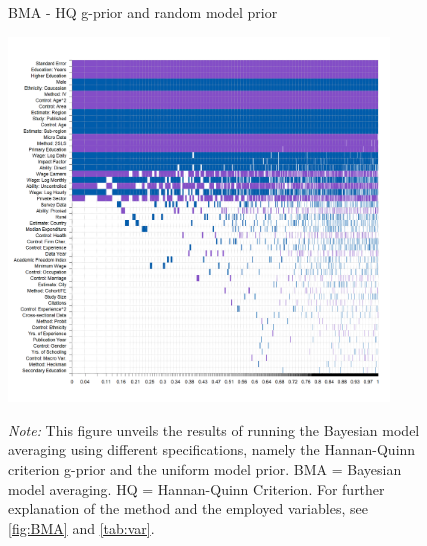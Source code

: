 \begin{figure}[!htbp]
\begin{center}
\caption{BMA - HQ g-prior and random model prior}
\label{fig:BMA4}
\includegraphics[width=0.9\textwidth]{Figures/BMA/bma_Hannan-Quinn_random_results.png}
\end{center}\vspace{-0.5cm}
\captionsetup{width=0.9\textwidth, font = scriptsize}
\caption*{\emph{Note:} This figure unveils the results of running the Bayesian model averaging using different specifications, namely the Hannan-Quinn criterion g-prior and the uniform model prior. BMA = Bayesian model averaging. HQ = Hannan-Quinn Criterion. For further explanation of the method and the employed variables, see \autoref{fig:BMA} and \autoref{tab:var}.
}
\end{figure}




